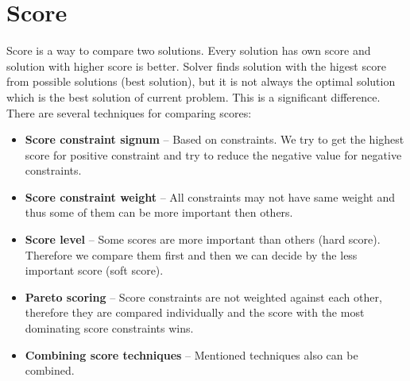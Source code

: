 \section{Score}\label{score}
Score is a way to compare two solutions. Every solution has own score and solution with higher score is better. Solver finds solution with the higest score from possible solutions (best solution), but it is not always the optimal solution which is the best solution of current problem. This is a significant difference. There are several techniques for comparing scores:
\begin{itemize}
\item \textbf{Score constraint signum} -- Based on constraints. We try to get the highest score for positive constraint and try to reduce the negative value for negative constraints.
\item \textbf{Score constraint weight} -- All constraints may not have same weight and thus some of them can be more important then others.
\item \textbf{Score level} -- Some scores are more important than others (hard score). Therefore we compare them first and then we can decide by the less important score (soft score).
\item \textbf{Pareto scoring} -- Score constraints are not weighted against each other, therefore they are compared individually and the score with the most dominating score constraints wins.
\item \textbf{Combining score techniques} -- Mentioned techniques also can be combined.
 
\end{itemize}

